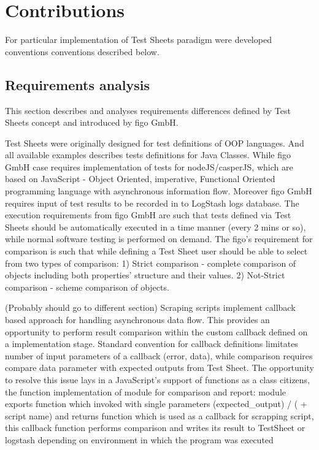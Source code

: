 \chapter{Contributions}
\label{sec:contributions}
For particular implementation of Test Sheets paradigm were developed conventions conventions described below. 
\section{Requirements analysis}
This section describes and analyses requirements differences defined by Test Sheets concept and introduced by figo GmbH.

Test Sheets were originally designed for test definitions of  OOP languages. And all available examples describes tests definitions for Java Classes. While figo GmbH case requires implementation of tests for nodeJS/casperJS, which are based on JavaScript - Object Oriented, imperative, Functional Oriented programming language with asynchronous information flow. Moreover figo GmbH requires input of test results to be recorded in to LogStash logs database. The execution requirements from figo GmbH are such that tests defined via Test Sheets should be automatically executed in a time manner (every 2 mins or so), while normal software testing is performed on demand.
The figo's requirement for comparison is such that while defining a Test Sheet user should be able to select from two types of comparison: 1) Strict comparison - complete comparison of objects including both properties' structure and their values. 2) Not-Strict comparison - scheme comparison of objects.

(Probably should go to different section)
Scraping scripts implement callback based approach for handling asynchronous data flow. This provides an opportunity to perform result comparison within the custom callback defined on a implementation stage.
Standard convention for callback definitions limitates number of input parameters of a callback (error, data), while comparison requires compare data parameter with expected outputs from Test Sheet. The opportunity to resolve this issue lays in a JavaScript's support of functions as a class citizens, the function implementation of module for comparison and report: module exports function which invoked with single parameters (expected\_output) / ( + script name) and returns function which is used as a callback for scrapping script, this callback function performs comparison and writes its result to TestSheet or logstash depending on environment in which the program was executed

